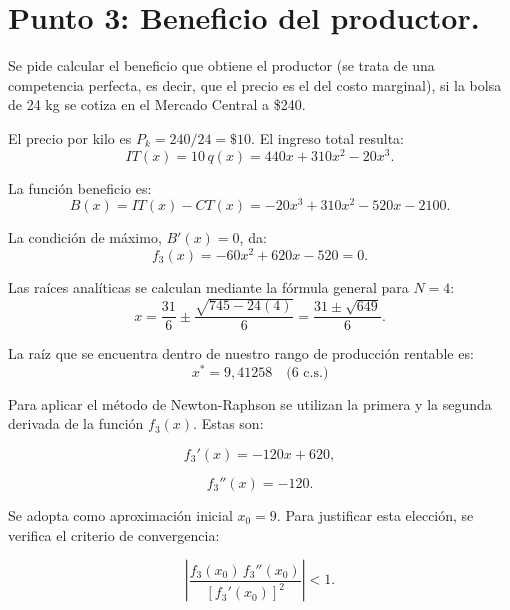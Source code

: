 \section{Punto 3: Beneficio del productor.}

Se pide calcular el beneficio que obtiene el productor (se trata de una competencia perfecta, es decir, que el precio es el del costo marginal), si la bolsa de 24 kg se cotiza en el Mercado Central a \$240.

El precio por kilo es $P_k = 240/24 = \$10$. El ingreso total resulta:
\begin{equation}
    IT(x) = 10\,q(x) = 440x + 310x^2 - 20x^3.
\end{equation}

La función beneficio es:
\begin{equation}
    B(x) = IT(x) - CT(x) = -20x^3 + 310x^2 - 520x - 2100.
\end{equation}

La condición de máximo, $B'(x) = 0$, da:
\begin{equation}
    f_3(x) = -60x^2 + 620x - 520 = 0.
    \label{eq:f3}
\end{equation}

Las raíces analíticas se calculan mediante la fórmula general para $N=4$:
\begin{equation}
    x = \dfrac{31}{6} \pm \dfrac{\sqrt{745-24(4)}}{6}
    = \dfrac{31 \pm \sqrt{649}}{6}.
\end{equation}

La raíz que se encuentra dentro de nuestro rango de producción rentable es:
\begin{equation}
    \boxed{x^* = 9{,}41258 \quad \text{(6 c.s.)}}
\end{equation}

Para aplicar el método de Newton-Raphson se utilizan la primera y la segunda derivada de la función $f_3(x)$. Estas son:

\begin{equation}
    f_3'(x) = -120x + 620,
\end{equation}

\begin{equation}
    f_3''(x) = -120.
\end{equation}

Se adopta como aproximación inicial $x_0 = 9$. Para justificar esta elección, se verifica el criterio de convergencia:

\begin{equation}
    \left|
    \frac{f_3(x_0)\,f_3''(x_0)}
    {[f_3'(x_0)]^2}
    \right| < 1.
\end{equation}

